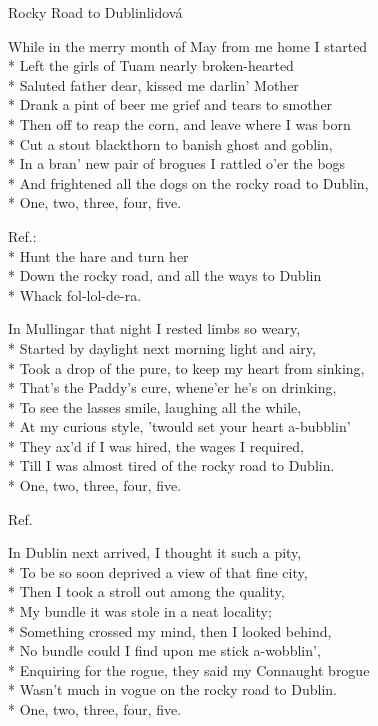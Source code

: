\documentclass[10.5pt]{book}
\begin{document}
\begin{poem}{Rocky Road to Dublin}{lidová}

\settowidth{\versewidth}{And I have frightened all the dogs on the rocky road
to Dublin,}

While in the merry month of May from me home I started\\*
Left the girls of Tuam nearly broken-hearted\\*
Saluted father dear, kissed me darlin' Mother\\*
Drank a pint of beer me grief and tears to smother\\*
Then off to reap the corn, and leave where I was born\\*
Cut a stout blackthorn to banish ghost and goblin,\\*
In a bran' new pair of brogues I rattled o'er the bogs\\*
And frightened all the dogs on the rocky road to Dublin,\\*
One, two, three, four, five. 

Ref.:\\*
Hunt the hare and turn her\\*
Down the rocky road, and all the ways to Dublin\\*
Whack fol-lol-de-ra.

In Mullingar that night I rested limbs so weary,\\*
Started by daylight next morning light and airy,\\*
Took a drop of the pure, to keep my heart from \mbox{sinking},\\*
That's the Paddy's cure, whene'er he's on drinking,\\*
To see the lasses smile, laughing all the while,\\*
At my curious style, 'twould set your heart a-bubblin'\\*
They ax'd if I was hired, the wages I required,\\*
Till I was almost tired of the rocky road to Dublin.\\*
One, two, three, four, five. 

Ref.

In Dublin next arrived, I thought it such a pity,\\*
To be so soon deprived a view of that fine city,\\*
Then I took a stroll out among the quality,\\*
My bundle it was stole in a neat locality;\\*
Something crossed my mind, then I looked behind,\\*
No bundle could I find upon me stick a-wobblin',\\*
Enquiring for the rogue, they said my Connaught brogue\\*
Wasn't much in vogue on the rocky road to Dublin.\\*
One, two, three, four, five. 


\end{poem}
\end{document}
